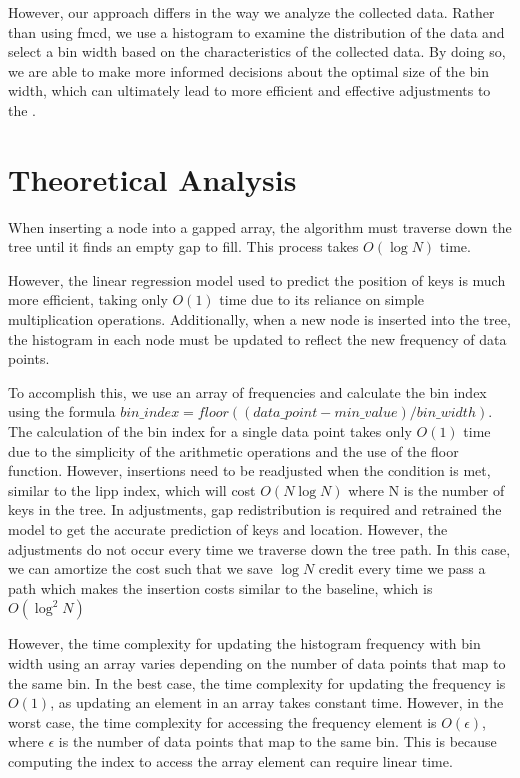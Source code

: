 However, our approach differs in the way we analyze the collected data. Rather than using \acrfull{fmcd}\cite{LIPP}, we use a histogram to examine the distribution of the data and select a bin width based on the characteristics of the collected data.  By doing so, we are able to make more informed decisions about the optimal size of the bin width, which can ultimately lead to more efficient and effective adjustments to the \learnindex.




\section{Theoretical Analysis}
When inserting a node into a gapped array, the algorithm must traverse down the tree until it finds an empty gap to fill. This process takes $O(\log N)$ time.

However, the linear regression model used to predict the position of keys is much more efficient, taking only $O(1)$ time due to its reliance on simple multiplication operations. Additionally, when a new node is inserted into the tree, the histogram in each node must be updated to reflect the new frequency of data points.

To accomplish this, we use an array of frequencies and calculate the bin index using the formula $bin\_index = floor((data\_point - min\_value) / bin\_width)$. The calculation of the bin index for a single data point takes only $O(1)$ time due to the simplicity of the arithmetic operations and the use of the floor function. However, insertions need to be readjusted when the condition is met, similar to the \acrshort{lipp} index, which will cost $O(N\log N)$ where N is the number of keys in the tree. In adjustments, gap redistribution is required and retrained the model to get the accurate prediction of keys and location. However, the adjustments do not occur every time we traverse down the tree path. In this case, we can amortize the cost such that we save $\log N$ credit every time we pass a path which makes the insertion costs similar to the baseline, which is $O(\log^2 N)$

However, the time complexity for updating the histogram frequency with bin width using an array varies depending on the number of data points that map to the same bin. In the best case, the time complexity for updating the frequency is $O(1)$, as updating an element in an array takes constant time. However, in the worst case, the time complexity for accessing the frequency element is $O(\epsilon)$, where $\epsilon$ is the number of data points that map to the same bin. This is because computing the index to access the array element can require linear time.

